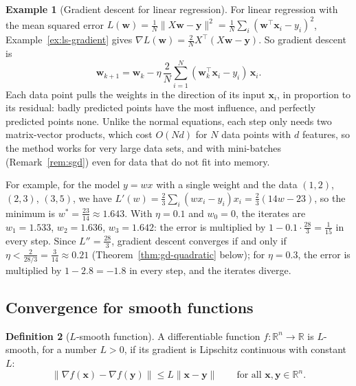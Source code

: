 \documentclass[11pt]{article}
\newcommand{\norm}[1]{\lVert #1 \rVert}
\theoremstyle{definition}
\newtheorem{definition}{Definition}[section]
\newtheorem{example}[definition]{Example}
\theoremstyle{plain}
\theoremstyle{remark}
\begin{document}
\begin{example}[Gradient descent for linear regression]\label{ex:gd-mse}
    For linear regression with the mean squared error $L(\mathbf{w}) = \frac{1}{N}\norm{X\mathbf{w} - \mathbf{y}}^2 = \frac{1}{N}\sum_i (\mathbf{w}^\top\mathbf{x}_i - y_i)^2$, Example~\ref{ex:ls-gradient} gives $\nabla L(\mathbf{w}) = \frac{2}{N}X^\top(X\mathbf{w} - \mathbf{y})$. So gradient descent is
    \[\mathbf{w}_{k+1} = \mathbf{w}_k - \eta\,\frac{2}{N}\sum_{i=1}^N (\mathbf{w}_k^\top\mathbf{x}_i - y_i)\,\mathbf{x}_i.\]
    Each data point pulls the weights in the direction of its input $\mathbf{x}_i$, in proportion to its residual: badly predicted points have the most influence, and perfectly predicted points none. Unlike the normal equations, each step only needs two matrix-vector products, which cost $O(Nd)$ for $N$ data points with $d$ features, so the method works for very large data sets, and with mini-batches (Remark~\ref{rem:sgd}) even for data that do not fit into memory.

    For example, for the model $y = wx$ with a single weight and the data $(1, 2)$, $(2, 3)$, $(3, 5)$, we have $L'(w) = \frac{2}{3}\sum_i (wx_i - y_i)x_i = \frac{2}{3}(14w - 23)$, so the minimum is $w^* = \frac{23}{14} \approx 1.643$. With $\eta = 0.1$ and $w_0 = 0$, the iterates are $w_1 = 1.533$, $w_2 = 1.636$, $w_3 = 1.642$: the error is multiplied by $1 - 0.1 \cdot \frac{28}{3} = \frac{1}{15}$ in every step. Since $L'' = \frac{28}{3}$, gradient descent converges if and only if $\eta < \frac{2}{28/3} = \frac{3}{14} \approx 0.21$ (Theorem~\ref{thm:gd-quadratic} below); for $\eta = 0.3$, the error is multiplied by $1 - 2.8 = -1.8$ in every step, and the iterates diverge.
\end{example}

\subsection{Convergence for smooth functions}

\begin{definition}[$L$-smooth function]
    A differentiable function $f: \mathbb{R}^n \to \mathbb{R}$ is $L$-smooth, for a number $L > 0$, if its gradient is Lipschitz continuous with constant $L$:
    \[\norm{\nabla f(\mathbf{x}) - \nabla f(\mathbf{y})} \leq L\norm{\mathbf{x} - \mathbf{y}} \qquad \text{for all } \mathbf{x}, \mathbf{y} \in \mathbb{R}^n.\]
\end{definition}
\end{document}
